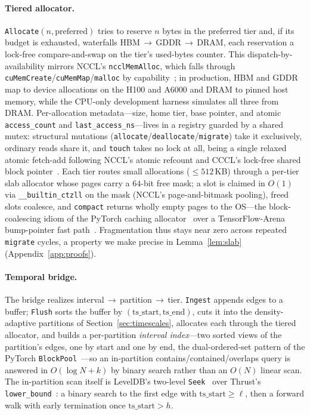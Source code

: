 \documentclass[10pt]{article}
\theoremstyle{definition}
\begin{document}
\paragraph{Tiered allocator.}
\texttt{Allocate}$(n,\text{preferred})$ tries to reserve $n$ bytes in the
preferred tier and, if its budget is exhausted, waterfalls
HBM\,$\rightarrow$\,GDDR\,$\rightarrow$\,DRAM, each reservation a lock-free
compare-and-swap on the tier's used-bytes counter. This dispatch-by-availability
mirrors NCCL's \texttt{ncclMemAlloc}, which falls through
\texttt{cuMemCreate}/\texttt{cuMemMap}/\texttt{malloc} by
capability~\citep{nccl}; in production, HBM and GDDR map to device allocations on
the H100 and A6000 and DRAM to pinned host memory, while the CPU-only development
harness simulates all three from DRAM. Per-allocation metadata---size, home tier,
base pointer, and atomic \texttt{access\_count} and \texttt{last\_access\_ns}---lives
in a registry guarded by a shared mutex: structural mutations
(\texttt{allocate}/\texttt{deallocate}/\texttt{migrate}) take it exclusively,
ordinary reads share it, and \texttt{touch} takes no lock at all, being a single
relaxed atomic fetch-add following NCCL's atomic refcount and CCCL's lock-free
shared block pointer~\citep{cccl}. Each tier routes small allocations
($\le 512$\,KB) through a per-tier slab allocator whose pages carry a $64$-bit free
mask; a slot is claimed in $O(1)$ via \texttt{\_\_builtin\_ctzll} on the mask
(NCCL's page-and-bitmask pooling), freed slots coalesce, and \texttt{compact}
returns wholly empty pages to the OS---the block-coalescing idiom of the PyTorch
caching allocator~\citep{paszke2019pytorch} over a TensorFlow-Arena bump-pointer
fast path~\citep{abadi2016tensorflow}. Fragmentation thus stays near zero across
repeated \texttt{migrate} cycles, a property we make precise in
Lemma~\ref{lem:slab} (Appendix~\ref{app:proofs}).

\paragraph{Temporal bridge.}
The bridge realizes interval\,$\rightarrow$\,partition\,$\rightarrow$\,tier.
\texttt{Ingest} appends edges to a buffer; \texttt{Flush} sorts the buffer by
$(\mathrm{ts\_start},\mathrm{ts\_end})$, cuts it into the density-adaptive
partitions of Section~\ref{sec:timescales}, allocates each through the tiered
allocator, and builds a per-partition \emph{interval index}---two sorted views of
the partition's edges, one by start and one by end, the dual-ordered-set pattern of
the PyTorch \texttt{BlockPool}~\citep{paszke2019pytorch}---so an in-partition
contains/contained/overlaps query is answered in $O(\log N + k)$ by binary search
rather than an $O(N)$ linear scan. The in-partition scan itself is LevelDB's
two-level \texttt{Seek}~\citep{leveldb} over Thrust's
\texttt{lower\_bound}~\citep{cccl}: a binary search to the first edge with
$\mathrm{ts\_start}\ge\ell$, then a forward walk with early termination once
$\mathrm{ts\_start}>h$.
\end{document}
